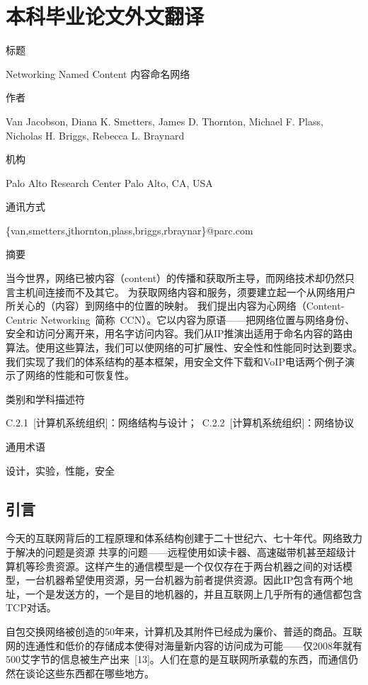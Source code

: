 \chapter{本科毕业论文外文翻译}

\heiti
标题

\songti
Networking Named Content 内容命名网络

\heiti
作者

\songti
Van Jacobson, Diana K. Smetters, James D. Thornton, Michael F. Plass, Nicholas H. Briggs,
Rebecca L. Braynard

\heiti
机构

\songti
Palo Alto Research Center Palo Alto, CA, USA

\heiti
通讯方式

\songti
\{van,smetters,jthornton,plass,briggs,rbraynar\}@parc.com

\heiti
摘要

\songti
当今世界，网络已被内容（content）的传播和获取所主导，而网络技术却仍然只言主机间连接而不及其它。%
为获取网络内容和服务，须要建立起一个从网络用户所关心的（内容）到网络中的位置的映射。%
我们提出内容为心网络（Content-Centric Networking~简称~CCN）。它以内容为原语——把网络位置与网络身份、安全和访问分离开来，用名字访问内容。我们从IP推演出适用于命名内容的路由算法。使用这些算法，我们可以使网络的可扩展性、安全性和性能同时达到要求。我们实现了我们的体系结构的基本框架，用安全文件下载和VoIP电话两个例子演示了网络的性能和可恢复性。

\heiti
类别和学科描述符

\songti
C.2.1~[计算机系统组织]：网络结构与设计；~C.2.2~[计算机系统组织]：网络协议

\heiti
通用术语

\songti
设计，实验，性能，安全



\section{引言}
今天的互联网背后的工程原理和体系结构创建于二十世纪六、七十年代。网络致力于解决的问题是资源
共享的问题——远程使用如读卡器、高速磁带机甚至超级计算机等珍贵资源。这样产生的通信模型是一个仅仅存在于两台机器之间的对话模型，一台机器希望使用资源，另一台机器为前者提供资源。因此IP包含有两个地址，一个是发送方的，一个是目的地机器的，并且互联网上几乎所有的通信都包含TCP对话。

自包交换网络被创造的50年来，计算机及其附件已经成为廉价、普适的商品。互联网的连通性和低价的存储成本使得对海量新内容的访问成为可能——仅2008年就有500艾字节的信息被生产出来~[13]。人们在意的是互联网所承载的东西，而通信仍然在谈论这些东西都在哪些地方。

